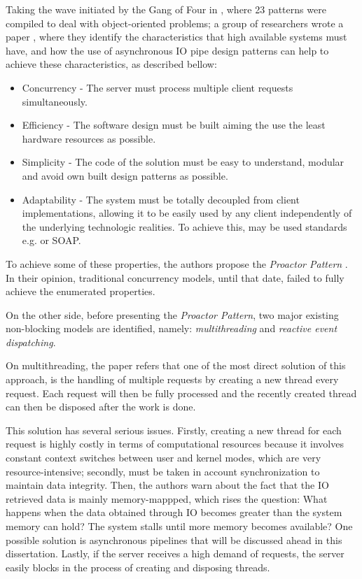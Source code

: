 Taking the wave initiated by the Gang of Four in \citep{gof}, where 23 patterns were compiled to deal with object-oriented problems; a group of researchers wrote a paper \citep{proactor}, where they identify the characteristics that high available systems must have, and how the use of asynchronous IO pipe design patterns can help to achieve these characteristics, as described bellow:
\begin{itemize}
	\item Concurrency - The server must process multiple client requests simultaneously.\\
	\item Efficiency - The software design must be built aiming the use the least hardware resources as possible. \\
	\item Simplicity - The code of the solution must be easy to understand, modular and avoid own built design patterns as possible. \\
    \item Adaptability - The system must be totally decoupled from client implementations, allowing it to be easily used by any client independently of the underlying technologic realities. To achieve this, may be used standards e.g. \cite{REST} or SOAP.\\
\end{itemize}

To achieve some of these properties, the authors propose the \textit{Proactor Pattern} \citep{proactor}. In their opinion, traditional concurrency models, until that date, failed to fully achieve the enumerated properties.

On the other side, before presenting the \textit{Proactor Pattern}, two major existing non-blocking models are identified, namely: \textit{multithreading} and \textit{reactive event dispatching}. 

On multithreading, the paper refers that one of the most direct solution of this approach, is the handling of multiple requests by creating a new thread every request. Each request will then be fully processed and the recently created thread can then be disposed after the work is done. 

This solution has several serious issues. Firstly, creating a new thread for each request is highly costly in terms of computational resources because it involves constant context switches between user and kernel modes, which are very resource-intensive; secondly, must be taken in account synchronization to maintain data integrity.
Then, the authors warn about the fact that the IO retrieved data is mainly memory-mappped, which rises the question: What happens when the data obtained through IO becomes greater than the system memory can hold? The system stalls until more memory becomes available? One possible solution is asynchronous pipelines that will be discussed ahead in this dissertation.
Lastly, if the server receives a high demand of requests, the server easily blocks in the process of creating and disposing threads. 

